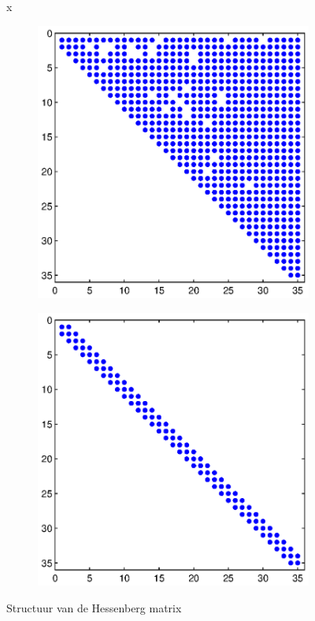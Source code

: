 \documentclass[a4paper, 12pt, titlepage]{report}
\begin{document}
\begin{figure}[!h]x
\begin{subfigure}{.5\textwidth}
\centering
\includegraphics[width=\textwidth]{structuur_hessenberg.eps}
\end{subfigure}
\begin{subfigure}{.5\textwidth}
\centering
\includegraphics[width=\textwidth]{afgerond.eps}
\end{subfigure}

\caption{Structuur van de Hessenberg matrix}
\label{hessenberg}
\end{figure}
\end{document}
